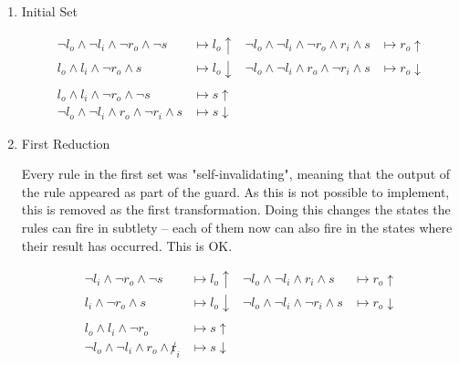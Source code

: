 \documentclass[times,10pt]{article}
\begin{document}
\begin{enumerate}

\item Initial Set




\begin{align*}
\lnot l_o \wedge \lnot l_i \wedge \lnot r_o \wedge \lnot s & \mapsto l_o \uparrow & \lnot l_o \wedge \lnot l_i \wedge \lnot r_o \wedge r_i \wedge s  & \mapsto r_o \uparrow \\
l_o \wedge l_i \wedge \lnot r_o \wedge s & \mapsto l_o \downarrow  & \lnot l_o \wedge \lnot l_i \wedge r_o \wedge \lnot r_i \wedge s & \mapsto r_o\downarrow \\ \\
l_o \wedge l_i \wedge \lnot r_o \wedge \lnot s & \mapsto s\uparrow & & \\
\lnot l_o \wedge \lnot l_i \wedge r_o \wedge \lnot r_i \wedge s & \mapsto s\downarrow & & 
\end{align*}

\item First Reduction

Every rule in the first set was "self-invalidating", meaning that the output of the rule appeared as part of the guard.  As this is not possible to implement, this is removed as the first transformation.  Doing this changes the states the rules can fire in subtlety -- each of them now can also fire in the states where their result has occurred.  This is OK.




\begin{align*}
\lnot l_i \wedge \lnot r_o \wedge \lnot s & \mapsto l_o \uparrow & \lnot l_o \wedge \lnot l_i \wedge r_i \wedge s  & \mapsto r_o \uparrow \\
l_i \wedge \lnot r_o \wedge s & \mapsto l_o \downarrow  & \lnot l_o \wedge \lnot l_i \wedge \lnot r_i \wedge s & \mapsto r_o\downarrow \\ \\
l_o \wedge l_i \wedge \lnot r_o& \mapsto s\uparrow & & \\
\lnot l_o \wedge \lnot l_i \wedge r_o \wedge \not r_i & \mapsto s\downarrow & & 
\end{align*}


\end{enumerate}
\end{document}
